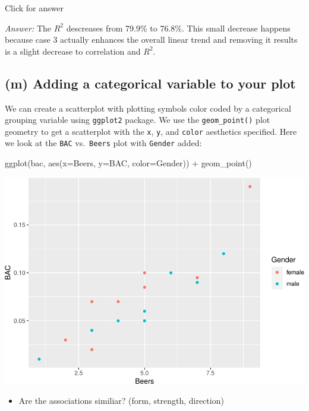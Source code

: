 \documentclass[
]{book}
\newenvironment{Shaded}{\begin{snugshade}}{\end{snugshade}}
\newcommand{\AttributeTok}[1]{\textcolor[rgb]{0.77,0.63,0.00}{#1}}
\newcommand{\FunctionTok}[1]{\textcolor[rgb]{0.00,0.00,0.00}{#1}}
\newcommand{\NormalTok}[1]{#1}
\newcommand{\SpecialCharTok}[1]{\textcolor[rgb]{0.00,0.00,0.00}{#1}}
\providecommand{\tightlist}{%
  \setlength{\itemsep}{0pt}\setlength{\parskip}{0pt}}
\begin{document}
Click for answer

\emph{Answer:} The \(R^2\) descreases from 79.9\% to 76.8\%. This small decrease happens because case 3 actually enhances the overall linear trend and removing it results is a slight decrease to correlation and \(R^2\).

\hypertarget{m-adding-a-categorical-variable-to-your-plot}{%
\subsection{(m) Adding a categorical variable to your plot}\label{m-adding-a-categorical-variable-to-your-plot}}

We can create a scatterplot with plotting symbols color coded by a categorical grouping variable using \texttt{ggplot2} package. We use the \texttt{geom\_point()} plot geometry to get a scatterplot with the \texttt{x}, \texttt{y}, and \texttt{color} aesthetics specified. Here we look at the \texttt{BAC} vs.~\texttt{Beers} plot with \texttt{Gender} added:

\begin{Shaded}
\begin{Highlighting}[]
\FunctionTok{ggplot}\NormalTok{(bac, }\FunctionTok{aes}\NormalTok{(}\AttributeTok{x=}\NormalTok{Beers, }\AttributeTok{y=}\NormalTok{BAC, }\AttributeTok{color=}\NormalTok{Gender)) }\SpecialCharTok{+} \FunctionTok{geom\_point}\NormalTok{()}
\end{Highlighting}
\end{Shaded}

\includegraphics[width=1\linewidth]{Class_Activity_6_files/figure-latex/unnamed-chunk-18-1}

\begin{itemize}
\tightlist
\item
  Are the associations similiar? (form, strength, direction)
\end{itemize}
\end{document}
